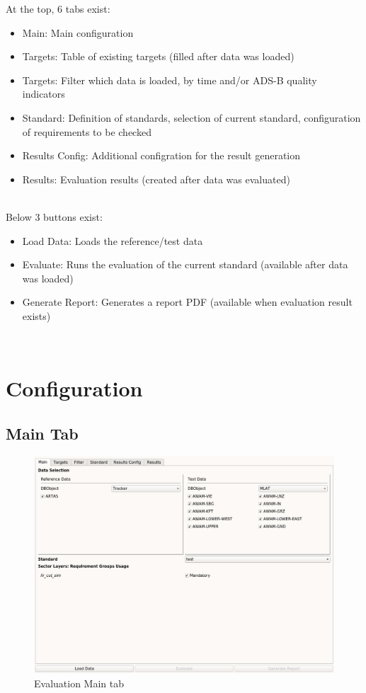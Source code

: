 At the top, 6 tabs exist:
\begin{itemize}  
\item Main: Main configuration
\item Targets: Table of existing targets (filled after data was loaded)
\item Targets: Filter which data is loaded, by time and/or ADS-B quality indicators
\item Standard: Definition of standards, selection of current standard, configuration of requirements to be checked
\item Results Config: Additional configration for the result generation
\item Results: Evaluation results (created after data was evaluated)
\end{itemize}
\ \\

Below 3 buttons exist:
\begin{itemize}  
\item Load Data: Loads the reference/test data
\item Evaluate: Runs the evaluation of the current standard (available after data was loaded)
\item Generate Report: Generates a report PDF (available when evaluation result exists)
\end{itemize}
\ \\

\section{Configuration}
\label{sec:eval_config} 

\subsection{Main Tab}

\begin{figure}[H]
  \hspace*{-2cm}
    \includegraphics[width=18cm,frame]{../screenshots/eval_overview.png}
  \caption{Evaluation Main tab}
\end{figure}

